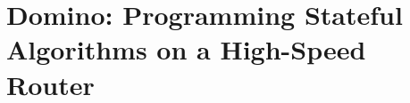 \chapter{Domino: Programming Stateful Algorithms on a High-Speed Router}
\label{chap:domino}







